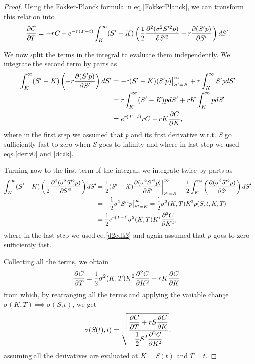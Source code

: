 \begin{proof}
Using the Fokker-Planck formula in eq.\eqref{FokkerPlanck}, we can transform this relation into
\begin{equation}
\pdv{C}{T}=-rC+e^{-r(T-t)}\int_K^\infty(S'-K)\left(\frac{1}{2}\pdv{^2(\sigma^2S'^2p)}{S'^2}-r\pdv{(S'p)}{S'}\right)dS'.
\end{equation}

We now split the terms in the integral to evaluate them independently. We integrate the second term by parts as
\begin{equation}
\begin{split}
\int_K^\infty(S'-K)\left(-r\pdv{(S'p)}{S'}\right)dS'&=-r(S'-K)(S'p)\big|_{S'=K}^\infty+r\int_K^\infty S'p dS'\\
&=r\int_K^\infty (S'-K)p dS'+rK\int_K^\infty p dS'\\
&=e^{r(T-t)}rC-rK\pdv{C}{K},
\end{split}
\end{equation}
\noindent where in the first step we assumed that $p$ and its first derivative w.r.t. $S$ go sufficiently fast to zero when $S$ goes to infinity and where in last step we used eqs.\eqref{deriv0} and \eqref{dcdk}.

Turning now to the first term of the integral, we integrate twice by parts as
\begin{equation}
\begin{split}
\int_K^\infty(S'-K)\left(\frac{1}{2}\pdv{^2(\sigma^2S'^2p)}{S'^2}\right)dS'&=\frac{1}{2}(S'-K)\pdv{(\sigma^2S'^2p)}{S'}\bigg|_{S'=K}^\infty-\frac{1}{2}\int_K^\infty\left(\pdv{(\sigma^2S'^2p)}{S'}\right)dS'\\
&=-\frac{1}{2}\sigma^2S'^2p\big|_{S'=K}^\infty=\frac{1}{2}\sigma^2(K,T)K^2p(S,t,K,T)\\
&=\frac{1}{2}e^{r(T-t)}\sigma^2(K,T)K^2\pdv{^2C}{K^2},
\end{split}
\end{equation}
\noindent where in the last step we used eq.\eqref{d2cdk2} and again assumed that $p$ goes to zero sufficiently fast.

Collecting all the terms, we obtain
\begin{equation}
\pdv{C}{T}=\frac{1}{2}\sigma^2(K,T)K^2\pdv{^2C}{K^2}-rK\pdv{C}{K}.
\end{equation}
\noindent from which, by rearranging all the terms and applying the variable change $\sigma(K,T)\implies \sigma(S,t)$, we get
\begin{equation}
\sigma(S(t),t)=\sqrt{\frac{\displaystyle\pdv{C}{T}+rS\pdv{C}{K}}{\displaystyle\frac{1}{2}S^2\pdv{^2C}{K^2}}}.
\end{equation}
\noindent assuming all the derivatives are evaluated at $K=S(t)$ and $T=t$.

\end{proof}

